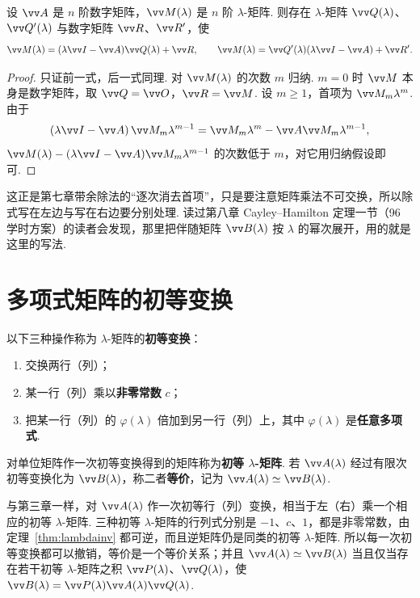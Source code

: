 	\begin{lemma}\label{lem:lambdadiv}
		设 $\vv A$ 是 $n$ 阶数字矩阵，$\vv M(\lambda)$ 是 $n$ 阶 $\lambda$-矩阵. 则存在 $\lambda$-矩阵 $\vv Q(\lambda)$、$\vv Q'(\lambda)$ 与数字矩阵 $\vv R$、$\vv R'$，使
		\[\vv M(\lambda)=(\lambda\vv I-\vv A)\vv Q(\lambda)+\vv R,\qquad \vv M(\lambda)=\vv Q'(\lambda)(\lambda\vv I-\vv A)+\vv R'.\]
	\end{lemma}
	\begin{proof}
		只证前一式，后一式同理. 对 $\vv M(\lambda)$ 的次数 $m$ 归纳. $m=0$ 时 $\vv M$ 本身是数字矩阵，取 $\vv Q=\vv O$，$\vv R=\vv M$. 设 $m\ge1$，首项为 $\vv M_m\lambda^m$. 由于
		\[(\lambda\vv I-\vv A)\,\vv M_m\lambda^{m-1}=\vv M_m\lambda^m-\vv A\vv M_m\lambda^{m-1},\]
		$\vv M(\lambda)-(\lambda\vv I-\vv A)\vv M_m\lambda^{m-1}$ 的次数低于 $m$，对它用归纳假设即可.
	\end{proof}
	
	这正是第七章带余除法的“逐次消去首项”，只是要注意矩阵乘法不可交换，所以除式写在左边与写在右边要分别处理. 读过第八章 Cayley–Hamilton 定理一节（96 学时方案）的读者会发现，那里把伴随矩阵 $\vv B(\lambda)$ 按 $\lambda$ 的幂次展开，用的就是这里的写法.
	
	\section{\hB 多项式矩阵的初等变换}\label{sec:lambdaelem}
	
	\begin{definition}
		以下三种操作称为 $\lambda$-矩阵的\textbf{初等变换}：
		\begin{enumerate}
			\item 交换两行（列）；
			\item 某一行（列）乘以\textbf{非零常数} $c$；
			\item 把某一行（列）的 $\varphi(\lambda)$ 倍加到另一行（列）上，其中 $\varphi(\lambda)$ 是\textbf{任意多项式}.
		\end{enumerate}
		对单位矩阵作一次初等变换得到的矩阵称为\textbf{初等 $\lambda$-矩阵}. 若 $\vv A(\lambda)$ 经过有限次初等变换化为 $\vv B(\lambda)$，称二者\textbf{等价}，记为 $\vv A(\lambda)\simeq\vv B(\lambda)$.
	\end{definition}
	
	与第三章一样，对 $\vv A(\lambda)$ 作一次初等行（列）变换，相当于左（右）乘一个相应的初等 $\lambda$-矩阵. 三种初等 $\lambda$-矩阵的行列式分别是 $-1$、$c$、$1$，都是非零常数，由定理~\ref{thm:lambdainv} 都可逆，而且逆矩阵仍是同类的初等 $\lambda$-矩阵. 所以每一次初等变换都可以撤销，等价是一个等价关系；并且 $\vv A(\lambda)\simeq\vv B(\lambda)$ 当且仅当存在若干初等 $\lambda$-矩阵之积 $\vv P(\lambda)$、$\vv Q(\lambda)$，使 $\vv B(\lambda)=\vv P(\lambda)\vv A(\lambda)\vv Q(\lambda)$.
	
